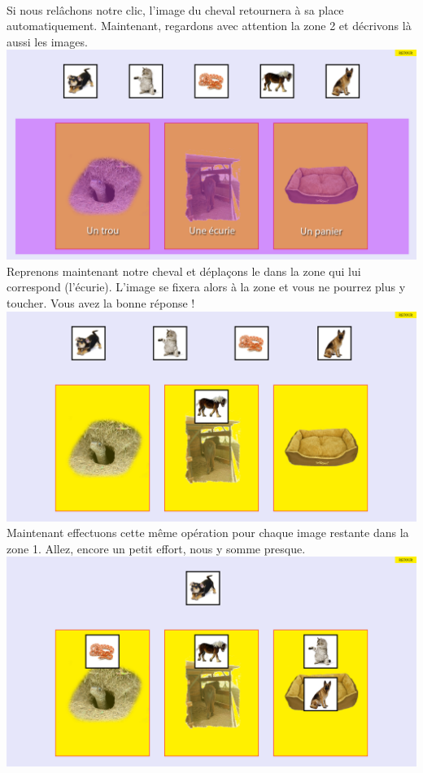 \documentclass{article}
\begin{document}
\vspace{0.5cm}\\
Si nous rel\^achons notre clic, l'image du cheval retournera \`a sa place automatiquement. Maintenant, regardons avec attention la zone 2 et d\'ecrivons l\`a aussi les images. 
\vspace{0.5cm}\\
\includegraphics[width=1.0\textwidth]{zone3}
\vspace{0.5cm}\\
Reprenons maintenant notre cheval et d\'epla\c{c}ons le dans la zone qui lui correspond (l'\'ecurie). L'image se fixera alors \`a la zone et vous ne pourrez plus y toucher. Vous avez la bonne r\'eponse !
\vspace{0.5cm}\\
\includegraphics[width=1.0\textwidth]{zone4}
\vspace{0.5cm}\\
Maintenant effectuons cette m\^eme op\'eration pour chaque image restante dans la zone 1. Allez, encore un petit effort, nous y somme presque.
\vspace{0.5cm}\\
\includegraphics[width=1.0\textwidth]{zone5}
\end{document}
